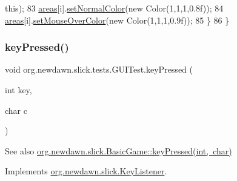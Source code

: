 \begin{DoxyCode}
{      this});
83             \mbox{\hyperlink{classorg_1_1newdawn_1_1slick_1_1tests_1_1_g_u_i_test_a45e7638907d2d4662aca08ffa006a326}{areas}}[i].\mbox{\hyperlink{classorg_1_1newdawn_1_1slick_1_1gui_1_1_mouse_over_area_a64c31f0ec3a3b74d9d6f9645f670e7cc}{setNormalColor}}(\textcolor{keyword}{new} Color(1,1,1,0.8f));
84             \mbox{\hyperlink{classorg_1_1newdawn_1_1slick_1_1tests_1_1_g_u_i_test_a45e7638907d2d4662aca08ffa006a326}{areas}}[i].\mbox{\hyperlink{classorg_1_1newdawn_1_1slick_1_1gui_1_1_mouse_over_area_a119e40b4e9db8a0828d38b9d9da85ab7}{setMouseOverColor}}(\textcolor{keyword}{new} Color(1,1,1,0.9f));
85         \}
86     \}
\end{DoxyCode}
\mbox{\label{classorg_1_1newdawn_1_1slick_1_1tests_1_1_g_u_i_test_a0922e0487eb33ea5669f9a24190cb124}} 
\subsubsection{\texorpdfstring{key\+Pressed()}{keyPressed()}}
{\footnotesize\ttfamily void org.\+newdawn.\+slick.\+tests.\+G\+U\+I\+Test.\+key\+Pressed (\begin{DoxyParamCaption}\item[{int}]{key,  }\item[{char}]{c }\end{DoxyParamCaption})\hspace{0.3cm}{\ttfamily [inline]}}

\begin{DoxySeeAlso}{See also}
\mbox{\hyperlink{classorg_1_1newdawn_1_1slick_1_1_basic_game_a4fbb3345b5abf5ddd54a99466d07f02f}{org.\+newdawn.\+slick.\+Basic\+Game\+::key\+Pressed(int, char)}} 
\end{DoxySeeAlso}


Implements \mbox{\hyperlink{interfaceorg_1_1newdawn_1_1slick_1_1_key_listener_ac0b0568a21ef486c4f51382614c196ef}{org.\+newdawn.\+slick.\+Key\+Listener}}.


